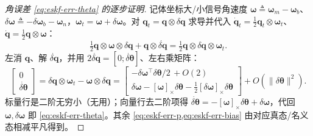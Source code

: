 \begin{proof}[角误差 \cref{eq:eskf-err-theta} 的逐步证明]
记体坐标大/小信号角速度 $\boldsymbol{\omega}\triangleq\boldsymbol{\omega}_m-\boldsymbol{\omega}_b$、$\delta\boldsymbol{\omega}\triangleq-\delta\boldsymbol{\omega}_b-\boldsymbol{\omega}_n$，$\boldsymbol{\omega}_t=\boldsymbol{\omega}+\delta\boldsymbol{\omega}$。对 $\mathbf{q}_t=\mathbf{q}\otimes\delta\mathbf{q}$ 求导并代入 $\dot{\mathbf{q}}_t=\tfrac12\mathbf{q}_t\otimes\boldsymbol{\omega}_t$、$\dot{\mathbf{q}}=\tfrac12\mathbf{q}\otimes\boldsymbol{\omega}$：
\[
  \tfrac12\mathbf{q}\otimes\boldsymbol{\omega}\otimes\delta\mathbf{q}+\mathbf{q}\otimes\dot{\delta\mathbf{q}}=\tfrac12\mathbf{q}\otimes\delta\mathbf{q}\otimes\boldsymbol{\omega}_t.
\]
左消 $\mathbf{q}$、解 $\dot{\delta\mathbf{q}}$，并用 $2\dot{\delta\mathbf{q}}=[0;\dot{\delta\boldsymbol{\theta}}]$、左右乘矩阵：
\[
  \begin{bmatrix}0\\\dot{\delta\boldsymbol{\theta}}\end{bmatrix}=\delta\mathbf{q}\otimes\boldsymbol{\omega}_t-\boldsymbol{\omega}\otimes\delta\mathbf{q}
  =\begin{bmatrix}-\delta\boldsymbol{\omega}^\top\delta\boldsymbol{\theta}/2\,+O(2)\\ \delta\boldsymbol{\omega}-[\boldsymbol{\omega}]_\times\delta\boldsymbol{\theta}-\tfrac12[\delta\boldsymbol{\omega}]_\times\delta\boldsymbol{\theta}\end{bmatrix}+O(\|\delta\boldsymbol{\theta}\|^2).
\]
标量行是二阶无穷小（无用）；向量行去二阶项得 $\dot{\delta\boldsymbol{\theta}}=-[\boldsymbol{\omega}]_\times\delta\boldsymbol{\theta}+\delta\boldsymbol{\omega}$，代回 $\boldsymbol{\omega},\delta\boldsymbol{\omega}$ 即 \cref{eq:eskf-err-theta}。其余 \cref{eq:eskf-err-p,eq:eskf-err-bias} 由对应真态/名义态相减平凡得到。
\end{proof}

